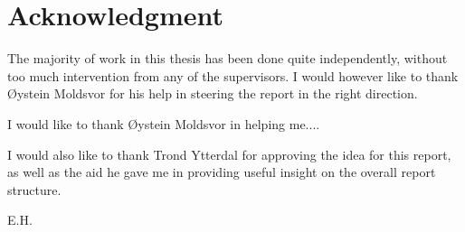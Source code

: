 \section*{Acknowledgment}




The majority of work in this thesis has been done quite independently, without too much intervention from any of the supervisors. I would however like to thank Øystein Moldsvor for his help in steering the report in the right direction.

I would like to thank Øystein Moldsvor in helping me....

I would also like to thank Trond Ytterdal for approving the idea for this report, as well as the aid he gave me in providing useful insight on the overall report structure. 

\begin{flushright}
E.H.\\[1pc]
\end{flushright}